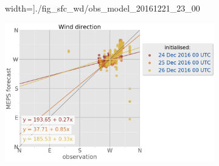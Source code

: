 \begin{figure}
\begin{subfigure}[b]{0.49\textwidth}
		width=\textwidth]{./fig_sfc_wd/obs_model_20161221_23_00}
		\caption{}\label{fig:scat:wd2123}
	\end{subfigure}
	\begin{subfigure}[b]{0.49\textwidth}
		\includegraphics[trim={0.cm 0cm 12.5cm 0cm},clip,
		width=\textwidth]{./fig_sfc_wd/obs_model_20161224_26_00}
		\caption{}\label{fig:scat:wd2426}
	\end{subfigure}
	

\end{figure}
